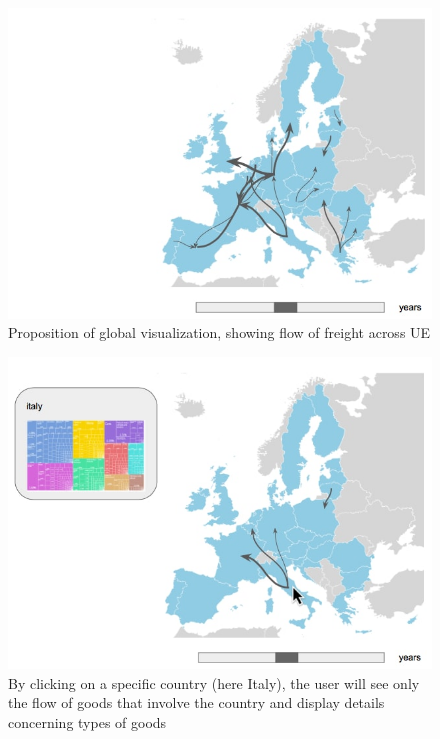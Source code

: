 \documentclass{vgtc}
\begin{document}
\begin{figure}[H]
\includegraphics[scale=0.35]{Capture_ecran_2017-11-29_171310.jpg}
\caption{Proposition of global visualization, showing flow of freight across UE}
\end{figure}

\begin{figure}[H]
\includegraphics[scale=0.35]{Capture_ecran_2017-11-29_171255.jpg}
\caption{By clicking on a specific country (here Italy), the user will see only the flow of goods that involve the country and display details concerning types of goods}
\end{figure}
\end{document}
